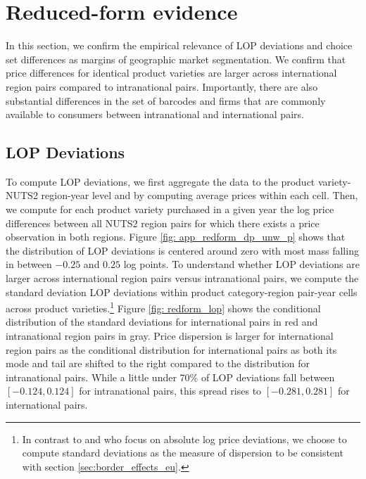 \section{Reduced-form evidence}\label{sec:reduced_form}

In this section, we confirm the empirical relevance of LOP deviations and choice set differences as margins of geographic market segmentation. We confirm that price differences for identical product varieties are larger across international region pairs compared to intranational pairs. Importantly, there are also substantial differences in the set of barcodes and firms that are commonly available to consumers between intranational and international pairs. 

\subsection{LOP Deviations}
To compute LOP deviations, we first aggregate the data to the product variety-NUTS2 region-year level and by computing average prices within each cell. Then, we compute for each product variety purchased in a given year the log price differences between all NUTS2 region pairs for which there exists a price observation in both regions. Figure \ref{fig: app_redform_dp_unw_p} shows that the distribution of LOP deviations is centered around zero with most mass falling in between $-0.25$ and $0.25$ log points. To understand whether LOP deviations are larger across international region pairs versus intranational pairs, we compute the standard deviation LOP deviations within product category-region pair-year cells across product varieties.\footnote{In contrast to \citet{Gopinath2011} and \citet{Beck2020} who focus on absolute log price deviations, we choose to compute standard deviations as the measure of dispersion to be consistent with section \ref{sec:border_effects_eu}.} Figure \ref{fig: redform_lop} shows the conditional distribution of the standard deviations for international pairs in red and intranational region pairs in gray. Price dispersion is larger for international region pairs as the conditional distribution for international pairs as both its mode and tail are shifted to the right compared to the distribution for intranational pairs. While a little under 70\% of LOP deviations fall between $[-0.124,0.124]$ for intranational pairs, this spread rises to $[-0.281,0.281]$ for international pairs.

